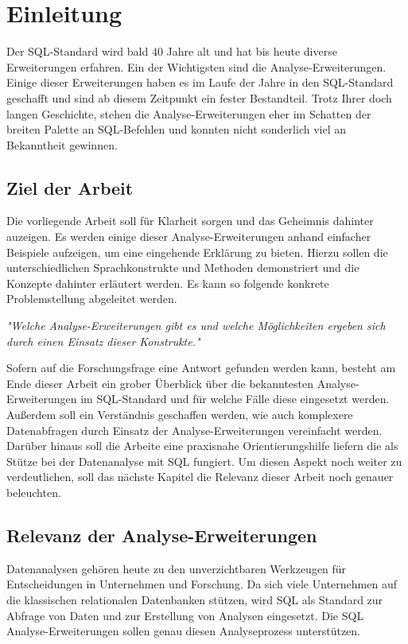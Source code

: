 \chapter{Einleitung}
\label{chap:einleitung} Der SQL-Standard wird bald 40 Jahre alt und hat bis heute
diverse Erweiterungen erfahren. Ein der Wichtigsten sind die Analyse-Erweiterungen.
Einige dieser Erweiterungen haben es im Laufe der Jahre in den SQL-Standard geschafft
und sind ab diesem Zeitpunkt ein fester Bestandteil. Trotz Ihrer doch langen
Geschichte, stehen die Analyse-Erweiterungen eher im Schatten der breiten Palette
an SQL-Befehlen und konnten nicht sonderlich viel an Bekanntheit gewinnen.

\section{Ziel der Arbeit}
\label{sec:ziel_der_arbeit} Die vorliegende Arbeit soll für Klarheit sorgen und das
Geheimnis dahinter auzeigen. Es werden einige dieser Analyse-Erweiterungen
anhand einfacher Beispiele aufzeigen, um eine eingehende Erklärung zu bieten.
Hierzu sollen die unterschiedlichen Sprachkonstrukte und Methoden demonstriert
und die Konzepte dahinter erläutert werden. Es kann so folgende konkrete Problemstellung
abgeleitet werden.
\begin{center}
	\textit{"Welche Analyse-Erweiterungen gibt es und welche Möglichkeiten ergeben
	sich durch einen Einsatz dieser Konstrukte."}
\end{center}
Sofern auf die Forschungsfrage eine Antwort gefunden werden kann, besteht am Ende
dieser Arbeit ein grober Überblick über die bekanntesten Analyse-Erweiterungen im
SQL-Standard und für welche Fälle diese eingesetzt werden. Außerdem soll ein
Verständnis geschaffen werden, wie auch komplexere Datenabfragen durch Einsatz der
Analyse-Erweiterungen vereinfacht werden. Darüber hinaus soll die Arbeite eine
praxisnahe Orientierungshilfe liefern die als Stütze bei der Datenanalyse mit
SQL fungiert. Um diesen Aspekt noch weiter zu verdeutlichen, soll das nächste
Kapitel die Relevanz dieser Arbeit noch genauer beleuchten.

\section{Relevanz der Analyse-Erweiterungen}
\label{sec:relevant} Datenanalysen gehören heute zu den unverzichtbaren
Werkzeugen für Entscheidungen in Unternehmen und Forschung. Da sich viele Unternehmen
auf die klassischen relationalen Datenbanken stützen, wird SQL als Standard zur
Abfrage von Daten und zur Erstellung von Analysen eingesetzt. Die SQL Analyse-Erweiterungen
sollen genau diesen Analyseprozess unterstützen.

